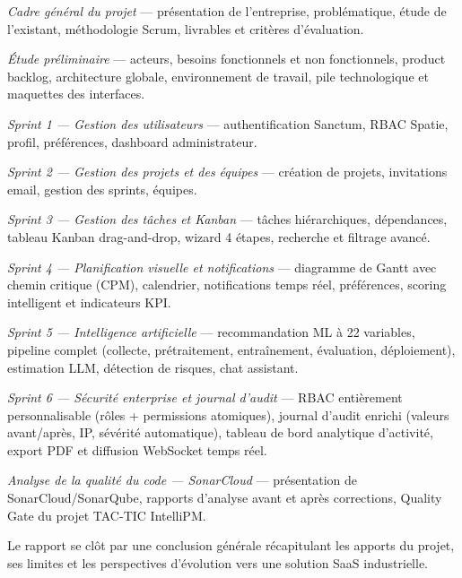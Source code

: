 \begin{description}[leftmargin=3cm,style=nextline]
  \item[Chapitre 1] \textit{Cadre général du projet} — présentation de l'entreprise,
        problématique, étude de l'existant, méthodologie Scrum, livrables et critères
        d'évaluation.

  \item[Chapitre 2] \textit{Étude préliminaire} — acteurs, besoins fonctionnels et
        non fonctionnels, product backlog, architecture globale, environnement de
        travail, pile technologique et maquettes des interfaces.

  \item[Chapitre 3] \textit{Sprint 1 — Gestion des utilisateurs} — authentification
        Sanctum, RBAC Spatie, profil, préférences, dashboard administrateur.

  \item[Chapitre 4] \textit{Sprint 2 — Gestion des projets et des équipes} —
        création de projets, invitations email, gestion des sprints, équipes.

  \item[Chapitre 5] \textit{Sprint 3 — Gestion des tâches et Kanban} — tâches
        hiérarchiques, dépendances, tableau Kanban drag-and-drop, wizard 4 étapes,
        recherche et filtrage avancé.

  \item[Chapitre 6] \textit{Sprint 4 — Planification visuelle et notifications} —
        diagramme de Gantt avec chemin critique (CPM), calendrier, notifications
        temps réel, préférences, scoring intelligent et indicateurs KPI.

  \item[Chapitre 7] \textit{Sprint 5 — Intelligence artificielle} — recommandation
        ML à 22 variables, pipeline complet (collecte, prétraitement, entraînement,
        évaluation, déploiement), estimation LLM, détection de risques, chat assistant.

  \item[Chapitre 8] \textit{Sprint 6 — Sécurité enterprise et journal d'audit} —
        RBAC entièrement personnalisable (rôles + permissions atomiques), journal
        d'audit enrichi (valeurs avant/après, IP, sévérité automatique), tableau
        de bord analytique d'activité, export PDF et diffusion WebSocket temps réel.

  \item[Chapitre 9] \textit{Analyse de la qualité du code — SonarCloud} — présentation
        de SonarCloud/SonarQube, rapports d'analyse avant et après corrections,
        Quality Gate du projet TAC-TIC IntelliPM.
\end{description}

\medskip
Le rapport se clôt par une conclusion générale récapitulant les apports du projet,
ses limites et les perspectives d'évolution vers une solution SaaS industrielle.
